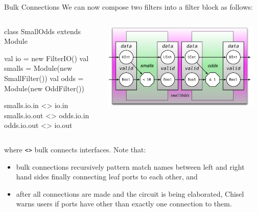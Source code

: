 \documentclass[xcolor=pdflatex,dvipsnames,table]{beamer}
\begin{document}
\begin{frame}[fragile]{Bulk Connections}
We can now compose two filters into a filter block as follows:

\begin{columns}

{
\begin{scala}
class SmallOdds extends Module { 
  val io     = new FilterIO()
  val smalls =
    Module(new SmallFilter())
  val odds   = 
    Module(new OddFilter())

  smalls.io.in  <> io.in
  smalls.io.out <> odds.io.in
  odds.io.out   <> io.out
}
\end{scala}
}


\begin{center}
\includegraphics[width=0.95\textwidth]{figs/small-odds.pdf} 
\end{center}

\end{columns}

\noindent
where \verb+<>+ bulk connects interfaces.  Note that:
\begin{itemize}
\item bulk connections recursively pattern match names between left and right hand sides finally connecting leaf ports to each other, and
\item after all connections are made and the circuit is being elaborated,
Chisel warns users if ports have other than exactly one connection to them.
\end{itemize}
\end{frame}
\end{document}
